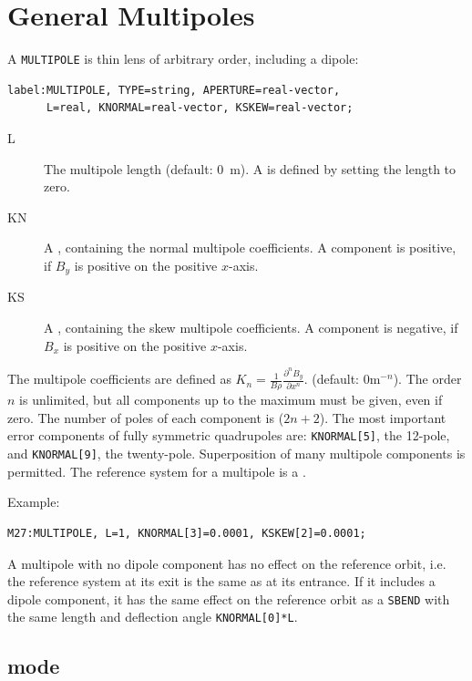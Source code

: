 \section{General Multipoles}
\label{sec:multipole}
A \texttt{MULTIPOLE} is thin lens of arbitrary order, including a dipole:
\begin{verbatim}
label:MULTIPOLE, TYPE=string, APERTURE=real-vector, 
      L=real, KNORMAL=real-vector, KSKEW=real-vector;
\end{verbatim}
\begin{description}
\item[L]
  The multipole length (default: 0~m).
  A  is defined by setting the length to zero.
\item[KN]
  A ,
  containing the normal multipole coefficients.
  A component is positive, if $B_y$ is positive on the positive $x$-axis.
\item[KS]
  A ,
  containing the skew multipole coefficients.
  A component is negative, if $B_x$ is positive on the positive $x$-axis.
\end{description}
The multipole coefficients are defined as
$K_{n} = \frac{1}{B \rho}\frac{\partial^n B_y}{\partial x^n}$.
(default: $0 \mathrm{m}^{-n}$).
The order $n$ is unlimited,
but all components up to the maximum must be given, even if zero.
The number of poles of each component is ($2 n + 2$).
The most important error components of fully symmetric quadrupoles are:
\texttt{KNORMAL[5]}, the 12-pole, and \texttt{KNORMAL[9]}, 
the twenty-pole.
Superposition of many multipole components is permitted.
The reference system for a multipole is a 
.

\noindent Example:
\begin{verbatim}
M27:MULTIPOLE, L=1, KNORMAL[3]=0.0001, KSKEW[2]=0.0001;
\end{verbatim}
A multipole with no dipole component has no effect on the reference orbit,
i.e. the reference system at its exit is the same as at its entrance.
If it includes a dipole component,
it has the same effect on the reference orbit as a \texttt{SBEND}
with the same length and deflection angle \texttt{KNORMAL[0]*L}.
\subsection{\opalt mode}

